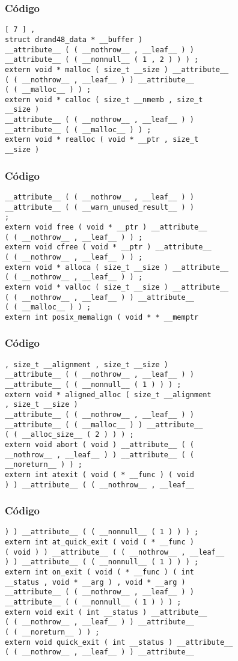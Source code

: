 \documentclass{beamer}
\begin{document}
\begin{frame}[fragile]
\frametitle{C\'odigo}
\begin{verbatim}
[ 7 ] , 
struct drand48_data * __buffer ) 
__attribute__ ( ( __nothrow__ , __leaf__ ) ) 
__attribute__ ( ( __nonnull__ ( 1 , 2 ) ) ) ; 
extern void * malloc ( size_t __size ) __attribute__ 
( ( __nothrow__ , __leaf__ ) ) __attribute__ 
( ( __malloc__ ) ) ; 
extern void * calloc ( size_t __nmemb , size_t 
__size ) 
__attribute__ ( ( __nothrow__ , __leaf__ ) ) 
__attribute__ ( ( __malloc__ ) ) ; 
extern void * realloc ( void * __ptr , size_t 
__size ) 
\end{verbatim}
\end{frame}
\begin{frame}[fragile]
\frametitle{C\'odigo}
\begin{verbatim}
__attribute__ ( ( __nothrow__ , __leaf__ ) ) 
__attribute__ ( ( __warn_unused_result__ ) ) 
; 
extern void free ( void * __ptr ) __attribute__ 
( ( __nothrow__ , __leaf__ ) ) ; 
extern void cfree ( void * __ptr ) __attribute__ 
( ( __nothrow__ , __leaf__ ) ) ; 
extern void * alloca ( size_t __size ) __attribute__ 
( ( __nothrow__ , __leaf__ ) ) ; 
extern void * valloc ( size_t __size ) __attribute__ 
( ( __nothrow__ , __leaf__ ) ) __attribute__ 
( ( __malloc__ ) ) ; 
extern int posix_memalign ( void * * __memptr 
\end{verbatim}
\end{frame}
\begin{frame}[fragile]
\frametitle{C\'odigo}
\begin{verbatim}
, size_t __alignment , size_t __size ) 
__attribute__ ( ( __nothrow__ , __leaf__ ) ) 
__attribute__ ( ( __nonnull__ ( 1 ) ) ) ; 
extern void * aligned_alloc ( size_t __alignment 
, size_t __size ) 
__attribute__ ( ( __nothrow__ , __leaf__ ) ) 
__attribute__ ( ( __malloc__ ) ) __attribute__ 
( ( __alloc_size__ ( 2 ) ) ) ; 
extern void abort ( void ) __attribute__ ( ( 
__nothrow__ , __leaf__ ) ) __attribute__ ( ( 
__noreturn__ ) ) ; 
extern int atexit ( void ( * __func ) ( void 
) ) __attribute__ ( ( __nothrow__ , __leaf__ 
\end{verbatim}
\end{frame}
\begin{frame}[fragile]
\frametitle{C\'odigo}
\begin{verbatim}
) ) __attribute__ ( ( __nonnull__ ( 1 ) ) ) ; 
extern int at_quick_exit ( void ( * __func ) 
( void ) ) __attribute__ ( ( __nothrow__ , __leaf__ 
) ) __attribute__ ( ( __nonnull__ ( 1 ) ) ) ; 
extern int on_exit ( void ( * __func ) ( int 
__status , void * __arg ) , void * __arg ) 
__attribute__ ( ( __nothrow__ , __leaf__ ) ) 
__attribute__ ( ( __nonnull__ ( 1 ) ) ) ; 
extern void exit ( int __status ) __attribute__ 
( ( __nothrow__ , __leaf__ ) ) __attribute__ 
( ( __noreturn__ ) ) ; 
extern void quick_exit ( int __status ) __attribute__ 
( ( __nothrow__ , __leaf__ ) ) __attribute__ 
\end{verbatim}
\end{frame}
\end{document}
